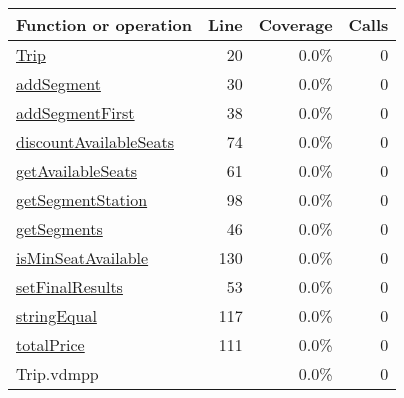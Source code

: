 \bigskip
\begin{longtable}{|l|r|r|r|}
\hline
Function or operation & Line & Coverage & Calls \\
\hline
\hline
\hyperref[Trip:20]{Trip} & 20&0.0\% & 0 \\
\hline
\hyperref[addSegment:30]{addSegment} & 30&0.0\% & 0 \\
\hline
\hyperref[addSegmentFirst:38]{addSegmentFirst} & 38&0.0\% & 0 \\
\hline
\hyperref[discountAvailableSeats:74]{discountAvailableSeats} & 74&0.0\% & 0 \\
\hline
\hyperref[getAvailableSeats:61]{getAvailableSeats} & 61&0.0\% & 0 \\
\hline
\hyperref[getSegmentStation:98]{getSegmentStation} & 98&0.0\% & 0 \\
\hline
\hyperref[getSegments:46]{getSegments} & 46&0.0\% & 0 \\
\hline
\hyperref[isMinSeatAvailable:130]{isMinSeatAvailable} & 130&0.0\% & 0 \\
\hline
\hyperref[setFinalResults:53]{setFinalResults} & 53&0.0\% & 0 \\
\hline
\hyperref[stringEqual:117]{stringEqual} & 117&0.0\% & 0 \\
\hline
\hyperref[totalPrice:111]{totalPrice} & 111&0.0\% & 0 \\
\hline
\hline
Trip.vdmpp & & 0.0\% & 0 \\
\hline
\end{longtable}

